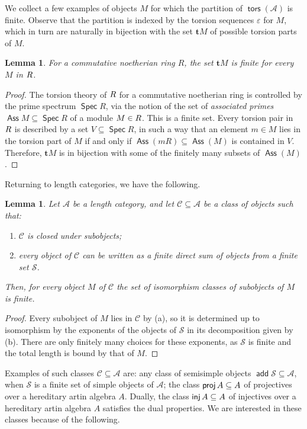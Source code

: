 \documentclass[a4paper,11pt]{amsart}
\theoremstyle{plain}
\newtheorem{lemma}[thm]{Lemma}
\theoremstyle{definition}
\newcommand{\Acal}{\mathcal{A}} \newcommand{\Bcal}{\mathcal{B}} \newcommand{\Ccal}{\mathcal{C}}
\newcommand{\Scal}{\mathcal{S}} \newcommand{\Tcal}{\mathcal{T}} \newcommand{\Ucal}{\mathcal{U}}
\renewcommand{\epsilon}{\varepsilon}
\DeclareMathOperator{\proj}{\mathsf{proj}}
\DeclareMathOperator{\inj}{\mathsf{inj}}
\DeclareMathOperator{\add}{\mathsf{add}}
\DeclareMathOperator{\tors}{\mathsf{tors}}
\let\mod\relax
\DeclareMathOperator{\mod}{\mathsf{mod}}
\DeclareMathOperator{\Spec}{\mathsf{Spec}}
\DeclareMathOperator{\Ass}{\mathsf{Ass}}
\begin{document}
We collect a few examples of objects $M$ for which the partition of
$\tors(\Acal)$ is finite. Observe that the partition is indexed by the torsion
sequences $\epsilon$ for $M$, which in turn are naturally in bijection with the
set $\mathbf{t}M$ of possible torsion parts of $M$.

\begin{lemma}
	For a commutative noetherian ring $R$, the set $\mathbf{t}M$ is finite for
	every $M$ in $\mod R$.
\end{lemma}

\begin{proof}
	The torsion theory of $\mod R$ for a commutative noetherian ring is controlled
	by the prime spectrum $\Spec R$, via the notion of the set of \emph{associated
	primes} $\Ass M\subseteq\Spec R$ of a module $M\in\mod R$. This is a finite
	set. Every torsion pair in $\mod R$ is described by a set $V\subseteq\Spec R$,
	in such a way that an element $m\in M$ lies in the torsion part of $M$ if
	and only if $\Ass(mR)\subseteq\Ass(M)$ is contained in $V$. Therefore,
	$\mathbf{t}M$ is in bijection with some of the finitely many subsets of
	$\Ass(M)$.
\end{proof}

Returning to length categories, we have the following.

\begin{lemma}\label{lemma:c-in-a}
		Let $\Acal$ be a length category, and let $\Ccal\subseteq\Acal$ be a class
		of objects such that:
		\begin{enumerate}[label=(\alph*)]
			\item	$\Ccal$ is closed under subobjects;
			\item every object of $\Ccal$ can be written as a finite direct sum of objects
			from a finite set $\Scal$.
		\end{enumerate}
		Then, for every object $M$ of $\Ccal$ the set of isomorphism classes of
		subobjects of $M$ is finite.
\end{lemma}

\begin{proof}
	Every subobject of $M$ lies in $\Ccal$ by (a), so it is determined up to
	isomorphism by the exponents of the objects of $\Scal$ in its decomposition
	given by (b). There are only finitely many choices for these exponents, as
	$\Scal$ is finite and the total length is bound by that of $M$.
\end{proof}

Examples of such classes $\Ccal\subseteq\Acal$ are: any class of semisimple
objects $\add \Scal\subseteq\Acal$, when $\Scal$ is a finite set of simple
objects of $\Acal$; the class $\proj A\subseteq\mod A$ of projectives over a
hereditary artin algebra $A$. Dually, the class $\inj A\subseteq\mod A$ of
injectives over a hereditary artin algebra $A$ satisfies the dual properties.
We are interested in these classes because of the following.
\end{document}
